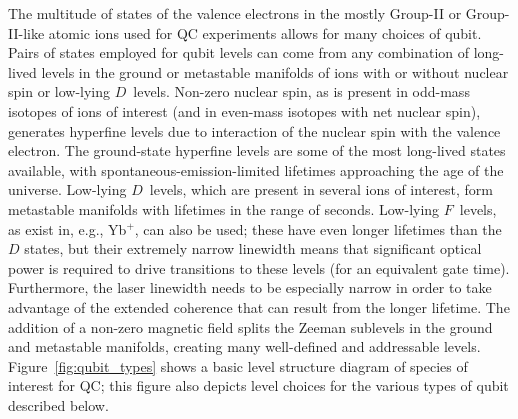\documentclass[%
12pt,
 amsmath,amssymb,
]{revtex4-2}
\begin{document}
The multitude of states of the valence electrons in the mostly Group-II or Group-II-like atomic ions used for QC experiments allows for many choices of qubit.  Pairs of states employed for qubit levels can come from any combination of long-lived levels in the ground or metastable manifolds of ions with or without nuclear spin or low-lying $D$~levels.  Non-zero nuclear spin, as is present in odd-mass isotopes of ions of interest (and in even-mass isotopes with net nuclear spin), generates hyperfine levels due to interaction of the nuclear spin with the valence electron.  The ground-state hyperfine levels are some of the most long-lived states available, with spontaneous-emission-limited lifetimes approaching the age of the universe.  Low-lying $D$~levels, which are present in several ions of interest, form metastable manifolds with lifetimes in the range of seconds.  Low-lying $F$~levels, as exist in, e.g., Yb$^{+}$, can also be used; these have even longer lifetimes than the $D$ states, but their extremely narrow linewidth means that significant optical power is required to drive transitions to these levels (for an equivalent gate time).  Furthermore, the laser linewidth needs to be especially narrow in order to take advantage of the extended coherence that can result from the longer lifetime. The addition of a non-zero magnetic field splits the Zeeman sublevels in the ground and metastable manifolds, creating many well-defined and addressable levels.  Figure~\ref{fig:qubit_types} shows  a basic level structure diagram of species of interest for QC; this figure also depicts level choices for the various types of qubit described below.
\end{document}
